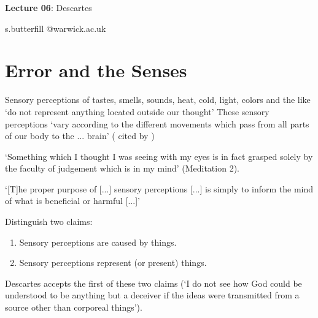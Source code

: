 \documentclass[12pt]{extarticle}
\date{}
\makeatletter
\def \ititle {Descartes}
\def \isubtitle {Lecture 02}
\def \iemail{s.butterfill @warwick.ac.uk}
\makeatother
\begin{document}
\begin{multicols*}{3}

\setlength\footnotesep{1em}










      
\def \ititle {Lecture 06}
 
\def \isubtitle {Descartes}
 
\begin{center}
 
{\Large
 
\textbf{\ititle}: \isubtitle
 
}
 
 
 
\iemail %
 
\end{center}
 
 
 
\section{Error and the Senses}
 
Sensory perceptions of tastes,
smells, sounds, heat, cold, light, colors and the like ‘do not represent
anything located outside our thought’
These sensory perceptions ‘vary according to the different movements which pass 
from all parts of our body to the ... brain’
(\citealp[p.~ 219, AT VIII:35]{descartes:1985_csm1} cited by \citealp[p.~348]{simmons:1999_are})
 
‘Something which I thought I was seeing with my eyes is in fact grasped solely by the faculty of
judgement which is in my mind’
(Meditation 2).
 
‘[T]he proper purpose of [...] sensory perceptions [...] is simply to inform the mind of what is beneficial or harmful [...]’ 
\citep[pp.~57-8]{descartes:1985_csm2}
 
Distinguish two claims:
\begin{enumerate}
    \item Sensory perceptions are caused by things. 
    \item Sensory perceptions represent (or present) things.
\end{enumerate}
Descartes accepts the first of these two claims (‘I do not see how God could be understood to be anything but a deceiver if the ideas were transmitted from a source other than corporeal things’).
 

\end{multicols*}
\end{document}
